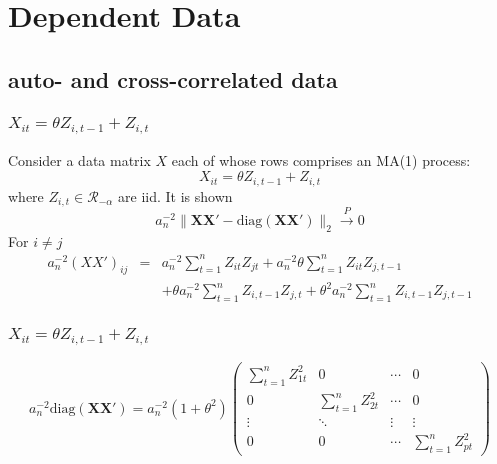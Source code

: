 \documentclass{beamer}
\begin{document}
  

\section[dependent data]{Dependent Data}
\subsection{auto- and cross-correlated data}
\begin{frame}
\frametitle{$X_{it} = \theta Z_{i, t-1} + Z_{i, t}$}
Consider a data matrix $X$ each of whose rows comprises an MA(1) process:
$$
X_{it} = \theta Z_{i, t-1} + Z_{i, t}
$$
where $Z_{i,t} \in \mathcal R_{-\alpha}$ are iid. It is shown
$$
a_n^{-2} \|\mathbf{XX'} - \text{diag}(\mathbf{XX'})\|_2 \overset{P}{\to} 0
$$
For $i \neq j$
\begin{eqnarray*}
  a_n^{-2}(XX')_{ij} &=& a_n^{-2} \sum_{t=1}^n Z_{it} Z_{jt} +
  a_n^{-2} \theta \sum_{t=1}^n Z_{it} Z_{j,t-1} \\
  && +\theta a_n^{-2} \sum_{t=1}^n Z_{i, t-1}
  Z_{j,t} + \theta^2 a_n^{-2} \sum_{t=1}^n Z_{i,t-1} Z_{j,t-1}
\end{eqnarray*}
\end{frame}

\begin{frame}
  \frametitle{$X_{it} = \theta Z_{i, t-1} + Z_{i, t}$}
  $$
  a_n^{-2}\text{diag}(\mathbf{XX'}) = a_n^{-2} (1+\theta^2)
  \begin{pmatrix}
    \sum_{t=1}^n Z_{1t}^2 & 0 & \cdots & 0 \\
    0 & \sum_{t=1}^n Z_{2t}^2 & \cdots & 0 \\
    \vdots & \ddots & \vdots & \vdots \\
    0 & 0 & \cdots & \sum_{t=1}^n Z_{pt}^2
  \end{pmatrix}
  $$
\end{frame}
\end{document}
